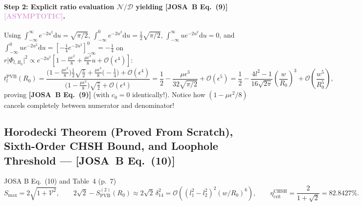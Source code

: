\documentclass[10pt,letterpaper]{article}
\newcommand{\abs}[1]{\lvert #1 \rvert}
\newcommand{\dd}{\mathrm{d}}
\newcommand{\josb}[1]{\textbf{[JOSA~B Eq.~(#1)]}}
\newcommand{\tagasymp}{\textcolor{plum}{\textbf{[ASYMPTOTIC]}}}
\numberwithin{equation}{section}
\begin{document}
\paragraph*{Step 2: Explicit ratio evaluation $\mathcal{N}/\mathcal{D}$ yielding \josb{9} \tagasymp{}.}
Using $\int_{-\infty}^\infty e^{-2u^2}\dd u = \sqrt{\pi/2}$, $\int_{-\infty}^0 e^{-2u^2}\dd u = \frac{1}{2}\sqrt{\pi/2}$, $\int_{-\infty}^\infty u e^{-2u^2}\dd u = 0$, and $\int_{-\infty}^0 u e^{-2u^2}\dd u = [-\frac{1}{4}e^{-2u^2}]_{-\infty}^0 = -\frac{1}{4}$ on $r\abs{\Phi_{l,R_0}}^2 \propto e^{-2u^2}[1 - \frac{\mu\epsilon^2}{8} + \frac{\mu\epsilon^3}{8}u + \mathcal{O}(\epsilon^4)]$:
\begin{equation}
  t_l^{\mathrm{PVB}}(R_0) = \frac{\bigl(1 - \frac{\mu\epsilon^2}{8}\bigr)\frac{1}{2}\sqrt{\frac{\pi}{2}} + \frac{\mu\epsilon^3}{8}\bigl(-\frac{1}{4}\bigr) + \mathcal{O}(\epsilon^4)}{\bigl(1 - \frac{\mu\epsilon^2}{8}\bigr)\sqrt{\frac{\pi}{2}} + \mathcal{O}(\epsilon^4)}
  = \frac{1}{2} - \frac{\mu\epsilon^3}{32\sqrt{\pi/2}} + \mathcal{O}(\epsilon^5)
  = \frac{1}{2} - \frac{4l^2 - 1}{16\sqrt{2\pi}}\left(\frac{w}{R_0}\right)^3 + \mathcal{O}\!\left(\frac{w^5}{R_0^5}\right),
\end{equation}
proving \josb{9} (with $c_0 = 0$ identically!). Notice how $(1 - \mu\epsilon^2/8)$ cancels completely between numerator and denominator!

\subsection{Horodecki Theorem (Proved From Scratch), Sixth-Order CHSH Bound, and Loophole Threshold --- \josb{10}}

\begin{targeteq}{JOSA B Eq.~(10) and Table~4 (p.~7)}
\[
  S_{\max} = 2\sqrt{1 + \mathcal{V}^2}, \qquad 2\sqrt{2} - S_{\mathrm{PVB}}^{(2)}(R_0) \approx 2\sqrt{2}\,\delta_{14}^2 = \mathcal{O}\!\left((l_1^2-l_2^2)^2(w/R_0)^6\right), \qquad \eta_{\mathrm{crit}}^{\mathrm{CHSH}} = \frac{2}{1+\sqrt{2}} = 82.8427\%.
\]
\end{targeteq}
\end{document}
